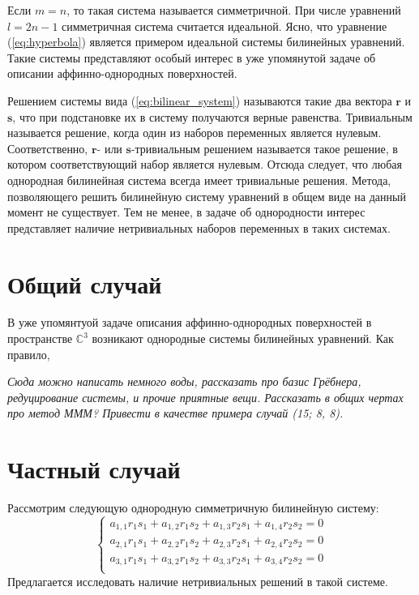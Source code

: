 Если $m = n$, то такая система называется симметричной. При числе уравнений $l = 2n - 1$ симметричная 
система считается идеальной. Ясно, что уравнение (\ref{eq:hyperbola}) является примером идеальной системы 
билинейных уравнений. Такие системы представляют особый интерес в уже упомянутой задаче об описании 
аффинно-однородных поверхностей. 

Решением системы вида (\ref{eq:bilinear_system}) называются такие два вектора $\mathbf{r}$ и $
\mathbf{s}$, что при подстановке их в систему получаются верные равенства. Тривиальным называется 
решение, когда один из наборов переменных является нулевым. Соответственно, $\mathbf{r}$- или $
\mathbf{s}$-тривиальным решением называется такое решение, в котором соответствующий набор является 
нулевым. Отсюда следует, что любая однородная билинейная система всегда имеет тривиальные решения. 
Метода, позволяющего решить билинейную систему уравнений в общем виде на данный момент не существует. 
Тем не менее, в задаче об однородности интерес представляет наличие нетривиальных наборов переменных 
в таких системах. 

\section{Общий случай} 

В уже упомянтуой задаче описания аффинно-однородных поверхностей в пространстве $ \mathbb{C}^3 $ возникают однородные системы билинейных уравнений. Как правило,

\textit{Сюда можно написать немного воды, рассказать про базис Грёбнера, редуцирование системы, и прочие 
приятные вещи. Рассказать в общих чертах про метод МММ? Привести в качестве примера случай (15; 8, 8).}

\section{Частный случай}

Рассмотрим следующую однородную симметричную билинейную систему: 
\begin{equation}\label{eq:trivial}
	\begin{cases}
		a_{1,1} r_1 s_1 + a_{1,2} r_1 s_2 + a_{1,3} r_2 s_1 + a_{1,4} r_2 s_2 = 0 \\
		a_{2,1} r_1 s_1 + a_{2,2} r_1 s_2 + a_{2,3} r_2 s_1 + a_{2,4} r_2 s_2 = 0 \\
		a_{3,1} r_1 s_1 + a_{3,2} r_1 s_2 + a_{3,3} r_2 s_1 + a_{3,4} r_2 s_2 = 0 \\
	\end{cases}
\end{equation}
Предлагается исследовать наличие нетривиальных решений в такой системе.

